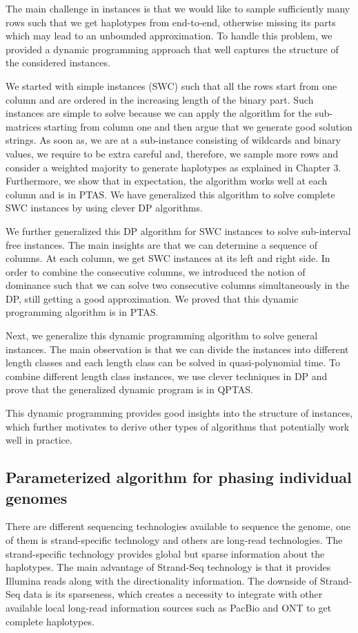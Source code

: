 The main challenge in \GMEC instances is that we would like to sample sufficiently many rows such that we get haplotypes from end-to-end, otherwise missing its parts which may lead to an unbounded approximation.
To handle this problem, we provided a dynamic programming approach that well captures the structure of the considered instances.

We started with simple instances (SWC) such that all the rows start from one column and are ordered in the increasing length of the binary part.
Such instances are simple to solve because we can apply the \BMEC algorithm for the sub-matrices starting from column one and then argue that we generate good solution strings.
As soon as, we are at a sub-instance consisting of wildcards and binary values, we require to be extra careful and, therefore, we sample more rows and consider a weighted majority to generate haplotypes as explained in Chapter 3.
Furthermore, we show that in expectation, the algorithm works well at each column and is in PTAS. 
We have generalized this algorithm to solve complete SWC instances by using clever DP algorithms.

We further generalized this DP algorithm for SWC instances to solve sub-interval free instances. 
The main insights are that we can determine a sequence of columns. At each column, we get SWC instances at its left and right side.
In order to combine the consecutive columns, we introduced the notion of dominance such that we can solve two consecutive columns simultaneously in the DP, still getting a good approximation.
We proved that this dynamic programming algorithm is in PTAS.

Next, we generalize this dynamic programming algorithm to solve general \GMEC instances. 
The main observation is that we can divide the instances into different length classes and each length class can be solved in quasi-polynomial time.
To combine different length class instances, we use clever techniques in DP and prove that the generalized dynamic program is in QPTAS.

This dynamic programming provides good insights into the structure of instances, which further motivates to derive other types of algorithms that potentially work well in practice.

\subsection{Parameterized algorithm for phasing individual genomes}
There are different sequencing technologies available to sequence the genome, one of them is strand-specific technology and others are long-read technologies.
The strand-specific technology provides global but sparse information about the haplotypes. The main advantage of Strand-Seq technology is that it provides Illumina reads along with the directionality information.
The downside of Strand-Seq data is its sparseness, which creates a necessity to integrate with other available local long-read information sources such as PacBio and ONT to get complete haplotypes.

